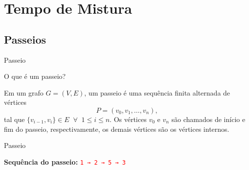\section{Tempo de Mistura}

\subsection{Passeios}

\begin{frame}{Passeio}
    \begin{block}{O que é um passeio?}

        Em um grafo $G = (V, E)$, um passeio é uma sequência finita alternada de vértices
        \[
            P = (v_0, v_1, \dots, v_n),
        \]
        tal que $\{v_{i-1}, v_i\} \in E \;\; \forall \;\; 1 \le i \le n$.
        Os vértices $v_0$ e $v_n$ são chamados de início e fim do passeio, respectivamente, os demais vértices são os vértices internos.
    \end{block}
\end{frame}


\begin{frame}{Passeio}
    \begin{center}  %
    \end{center}

    \vspace{0.5cm}

    {\large \textbf{Sequência do passeio:}}
    \quad
    \texttt{\textcolor{red}{1 → 2 → 5 → 3}}
\end{frame}

